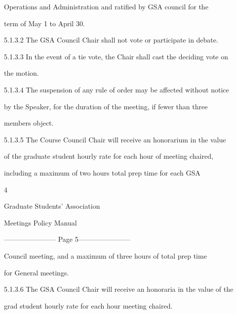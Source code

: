             Operations and Administration and ratified by  GSA  council for the  

            term of May 1 to April 30.   

  

5.1.3.2   The GSA Council Chair shall not vote or participate in debate.   

  

5.1.3.3   In the event of a tie vote, the Chair shall cast the deciding vote  on  

            the motion.   

  

5.1.3.4   The suspension of any rule of order may be affected without notice  



            by the Speaker, for the duration of the meeting, if fewer than three  



            members object.  



5.1.3.5   The Course Council Chair will receive an honorarium in the value  



            of the graduate student hourly rate for each hour of meeting chaired,  



            including  a  maximum  of  two  hours  total  prep  time  for  each  GSA  



                                                          4  

                                        

                                    Graduate Students’ Association  

                                        Meetings Policy Manual  

  


----------------------- Page 5-----------------------

             Council meeting, and a maximum of three hours of total prep time  



             for General meetings.  



5.1.3.6   The GSA Council Chair will receive an honoraria in the value of the  



             grad student hourly rate for each hour meeting chaired.   

